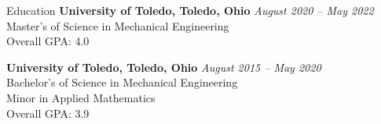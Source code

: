 \documentclass{bilal}
\begin{document}

\begin{rSection}{Education}
{\bf University of Toledo, Toledo, Ohio} \hfill {\em August 2020 -- May 2022} \\ 
Master's of Science in Mechanical Engineering \\
Overall GPA: 4.0

{\bf University of Toledo, Toledo, Ohio} \hfill {\em August 2015 -- May 2020} \\ 
Bachelor's of Science in Mechanical Engineering \\
Minor in Applied Mathematics \smallskip \\
Overall GPA: 3.9
\end{rSection}
\end{document}
